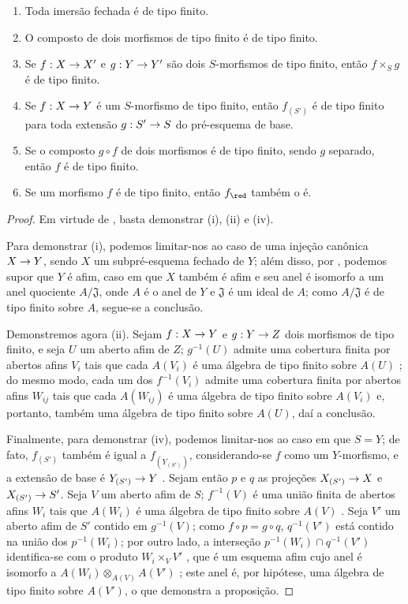\documentclass[oneside]{amsart}
\makeatletter
\newcommand{\ega@arrow}[2]{\mathchoice{#1}{#2}{#2}{#2}}
\renewcommand{\to}{\ega@arrow{\longrightarrow}{\rightarrow}}
\newcommand{\oldpage}[2][]{{\marginnote{\normalfont\textbf{#1}~|~#2}}\ignorespaces}
\let\EGAOriginalLabel\label
\renewcommand{\label}[1]{\phantomsection\EGAOriginalLabel{#1}}
\makeatother
\begin{document}
\begin{proposition}[6.3.4]
\label{I.6.3.4}
\medskip\noindent
\begin{enumerate}
  \item[{\rm(i)}] Toda imersão fechada é de tipo finito.
  \item[{\rm(ii)}] O composto de dois morfismos de tipo finito é de tipo finito.
  \item[{\rm(iii)}] Se $f:X\to X'$ e $g:Y\to Y'$ são dois $S$-morfismos de tipo finito, então $f\times_S g$ é de tipo finito.
  \item[{\rm(iv)}] Se $f:X\to Y$ é um $S$-morfismo de tipo finito, então $f_{(S')}$ é de tipo finito para toda extensão $g:S'\to S$ do pré-esquema de base.
  \item[{\rm(v)}] Se o composto $g\circ f$ de dois morfismos é de tipo finito, sendo $g$ separado, então $f$ é de tipo finito.
  \item[{\rm(vi)}] Se um morfismo $f$ é de tipo finito, então $f_\red$ também o é.
\end{enumerate}
\end{proposition}

\begin{proof}
Em virtude de , basta demonstrar (i), (ii) e (iv).

Para demonstrar (i), podemos limitar-nos ao caso de uma injeção canônica
$X\to Y$, sendo $X$ um subpré-esquema fechado de $Y$; além disso, por
, podemos supor que $Y$ é afim, caso em que $X$ também é afim
 e seu anel é isomorfo a um anel quociente
$A/\mathfrak{J}$, onde $A$ é o anel de $Y$ e $\mathfrak{J}$ é um ideal de
$A$; como $A/\mathfrak{J}$ é de tipo finito sobre $A$, segue-se a conclusão.

Demonstremos agora (ii). Sejam $f:X\to Y$ e $g:Y\to Z$ dois morfismos de
tipo finito, e seja $U$ um aberto afim de $Z$; $g^{-1}(U)$ admite uma
cobertura finita por abertos afins $V_i$ tais que cada $A(V_i)$ é uma
álgebra de tipo finito sobre $A(U)$ ; do mesmo modo,
\oldpage[I]{146}
cada um dos $f^{-1}(V_i)$ admite uma cobertura finita por abertos afins
$W_{ij}$ tais que cada $A(W_{ij})$ é uma álgebra de tipo finito sobre
$A(V_i)$ e, portanto, também uma álgebra de tipo finito sobre $A(U)$, daí a
conclusão.

Finalmente, para demonstrar (iv), podemos limitar-nos ao caso em que $S=Y$;
de fato, $f_{(S')}$ também é igual a $f_{(Y_{(S')})}$, considerando-se $f$
como um $Y$-morfismo, e a extensão de base é $Y_{(S')}\to Y$
. Sejam então $p$ e $q$ as projeções $X_{(S')}\to X$ e
$X_{(S')}\to S'$. Seja $V$ um aberto afim de $S$; $f^{-1}(V)$ é uma união
finita de abertos afins $W_i$ tais que $A(W_i)$ é uma álgebra de tipo finito
sobre $A(V)$ . Seja $V'$ um aberto afim de $S'$ contido em
$g^{-1}(V)$; como $f\circ p=g\circ q$, $q^{-1}(V')$ está contido na união
dos $p^{-1}(W_i)$; por outro lado, a interseção
$p^{-1}(W_i)\cap q^{-1}(V')$ identifica-se com o produto
$W_i\times_V V'$ , que é um esquema afim cujo anel é isomorfo
a $A(W_i)\otimes_{A(V)}A(V')$ ; este anel é, por hipótese, uma
álgebra de tipo finito sobre $A(V')$, o que demonstra a proposição.
\end{proof}
\end{document}
